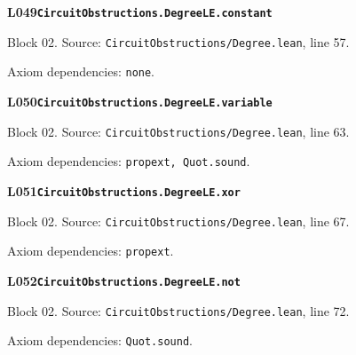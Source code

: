 \begin{minipage}{\linewidth}
\hypertarget{L049}{}
{\small\sffamily\bfseries\color{ink}L049\quad\nolinkurl{CircuitObstructions.DegreeLE.constant}}\par
{\scriptsize\sffamily\color{muted}Block 02. Source: \nolinkurl{CircuitObstructions/Degree.lean}, line 57.}\par
{}
{\scriptsize\sffamily\color{muted}Axiom dependencies: \nolinkurl{none}.}
\end{minipage}\par\medskip
\begin{minipage}{\linewidth}
\hypertarget{L050}{}
{\small\sffamily\bfseries\color{ink}L050\quad\nolinkurl{CircuitObstructions.DegreeLE.variable}}\par
{\scriptsize\sffamily\color{muted}Block 02. Source: \nolinkurl{CircuitObstructions/Degree.lean}, line 63.}\par
{}
{\scriptsize\sffamily\color{muted}Axiom dependencies: \nolinkurl{propext, Quot.sound}.}
\end{minipage}\par\medskip
\begin{minipage}{\linewidth}
\hypertarget{L051}{}
{\small\sffamily\bfseries\color{ink}L051\quad\nolinkurl{CircuitObstructions.DegreeLE.xor}}\par
{\scriptsize\sffamily\color{muted}Block 02. Source: \nolinkurl{CircuitObstructions/Degree.lean}, line 67.}\par
{}
{\scriptsize\sffamily\color{muted}Axiom dependencies: \nolinkurl{propext}.}
\end{minipage}\par\medskip
\begin{minipage}{\linewidth}
\hypertarget{L052}{}
{\small\sffamily\bfseries\color{ink}L052\quad\nolinkurl{CircuitObstructions.DegreeLE.not}}\par
{\scriptsize\sffamily\color{muted}Block 02. Source: \nolinkurl{CircuitObstructions/Degree.lean}, line 72.}\par
{}
{\scriptsize\sffamily\color{muted}Axiom dependencies: \nolinkurl{Quot.sound}.}
\end{minipage}\par\medskip
